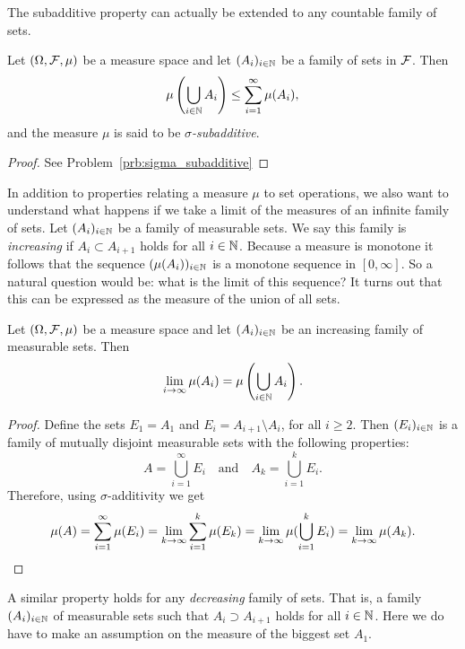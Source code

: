 The subadditive property can actually be extended to any countable family of sets.

\begin{lemma}\label{lem:sigma_subadditive}
Let $(\Omega, \mathcal F, \mu)$ be a measure space and let $(A_i)_{i \in \mathbb N}$ be a family of sets in $\mathcal F$. Then
\[
	\mu\left(\bigcup_{i \in \mathbb N} A_i\right) \le \sum_{i = 1}^\infty \mu(A_i),
\]
and the measure $\mu$ is said to be \emph{$\sigma$-subadditive}.
\end{lemma}

\begin{proof}
See Problem~\ref{prb:sigma_subadditive}
\end{proof}

In addition to properties relating a measure $\mu$ to set operations, we also want to understand what happens if we take a limit of the measures of an infinite family of sets. Let $(A_i)_{i \in \mathbb N}$ be a family of measurable sets. We say this family is \emph{increasing} if $A_i \subset A_{i+1}$ holds for all $i \in \mathbb N$. Because a measure is monotone it follows that the sequence $(\mu(A_i))_{i \in \mathbb N}$ is a monotone sequence in $[0,\infty]$. So a natural question would be: what is the limit of this sequence? It turns out that this can be expressed as the measure of the union of all sets.

\begin{proposition}\label{prop:continuity_measure_below}
Let $(\Omega, \mathcal F, \mu)$ be a measure space and let $(A_i)_{i \in \mathbb N}$ be an increasing family of measurable sets. Then
\[
	\lim_{i \to \infty} \mu(A_i) = \mu\left(\bigcup_{i \in \mathbb N} A_i\right).
\]
\end{proposition}

\begin{proof}
Define the sets $E_1 = A_1$ and $E_i = A_{i+1}\setminus A_i$, for all $i \ge 2$. Then $(E_i)_{i \in \mathbb N}$ is a family of mutually disjoint measurable sets with the following properties:
\[
	A = \bigcup_{i = 1}^\infty E_i \quad \text{and} \quad A_k = \bigcup_{i = 1}^k E_i.
\]
Therefore, using $\sigma$-additivity we get
\[
	\mu(A) = \sum_{i = 1}^\infty \mu(E_i) = \lim_{k \to \infty} \sum_{i = 1}^k \mu(E_k)
	= \lim_{k \to \infty} \mu(\bigcup_{i = 1}^k E_i) = \lim_{k \to \infty} \mu(A_k).\qedhere
\]
\end{proof}

A similar property holds for any \emph{decreasing} family of sets. That is, a family $(A_i)_{i \in \mathbb N}$ of measurable sets such that $A_i \supset A_{i+1}$ holds for all $i \in \mathbb N$. Here we do have to make an assumption on the measure of the biggest set $A_1$.

